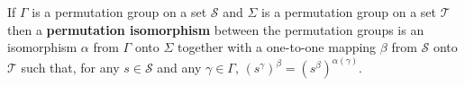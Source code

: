 If $\Gamma$ is a permutation group on a set $\mathcal{S}$ and $\Sigma$ is a permutation group on a set $\mathcal{T}$ then a \textbf{permutation isomorphism} between the permutation groups is an isomorphism $\alpha$ from $\Gamma$ onto $\Sigma$ together with a one-to-one mapping $\beta$ from $\mathcal{S}$ onto $\mathcal{T}$ such that, for any $s \in \mathcal{S}$ and any $\gamma \in \Gamma$, $(s^\gamma)^\beta = (s^\beta)^{\alpha(\gamma)}$.
